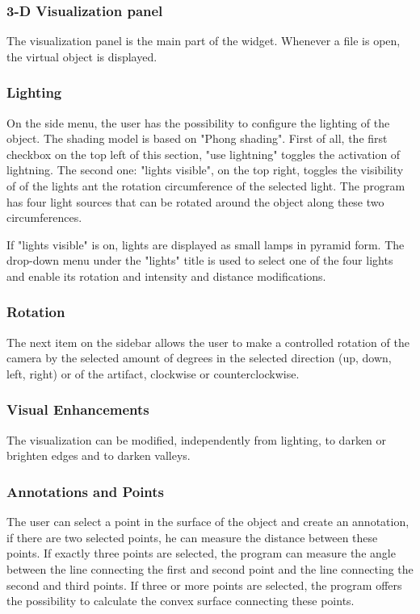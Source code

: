 \documentclass[12pt]{extarticle}
\begin{document}
	\subsubsection { 3-D Visualization panel}
	The visualization panel is the main part of the widget. Whenever a file is open, the virtual object is displayed.
	\subsubsection { Lighting}
	On the side menu, the user has the possibility to configure the lighting of the object. The shading model is based on "Phong shading". First of all, the first checkbox on the top left of this section, "use lightning" toggles the activation of lightning. The second one: "lights visible", on the top right, toggles the visibility of of the lights ant the rotation circumference of the selected light. The program has four light sources that can be rotated around the object along these two circumferences. 
	
	If "lights visible" is on, lights are displayed as small lamps in pyramid form. The drop-down menu under the "lights" title is used to select one of the four lights and enable its rotation and intensity and distance modifications.
	\subsubsection { Rotation}
	The next item on the sidebar allows the user to make a controlled rotation of the camera by the selected amount of degrees in the selected direction (up, down, left, right) or of the artifact, clockwise or counterclockwise.
	\subsubsection { Visual Enhancements}
	The visualization can be modified, independently from lighting, to darken or brighten edges and to darken valleys.
	\subsubsection { Annotations and Points}
	The user can select a point in the surface of the object and create an annotation, if there are two selected points, he can measure the distance between these points. If exactly three points are selected, the program can measure the angle between the line connecting the first and second point and the line connecting the second and third points.
	If three or more points are selected, the program offers the possibility to calculate the convex surface connecting these points.
\end{document}
